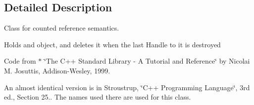 \subsection{Detailed Description}
Class for counted reference semantics. 

Holds and object, and deletes it when the last Handle to it is destroyed

Code from $\ast$ \char`\"{}\+The C++ Standard Library -\/ A Tutorial and Reference\char`\"{} by Nicolai M. Josuttis, Addison-\/\+Wesley, 1999.

An almost identical version is in Stroustrup, \char`\"{}\+C++ Programming Language\char`\"{}, 3rd ed., Section 25.. The names used there are used for this class. 